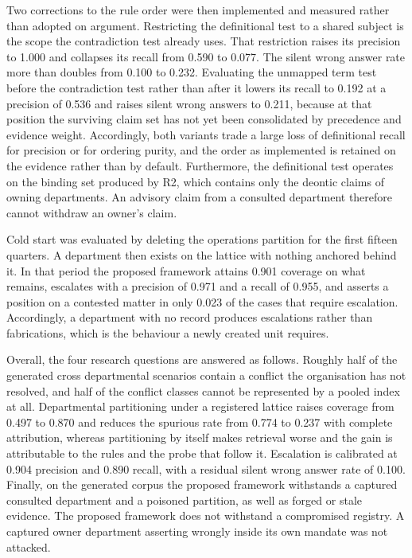 \documentclass[journal]{IEEEtran}
\begin{document}
Two corrections to the rule order were then implemented and measured rather than adopted on argument. Restricting the definitional test to a shared subject is the scope the contradiction test already uses. That restriction raises its precision to 1.000 and collapses its recall from 0.590 to 0.077. The silent wrong answer rate more than doubles from 0.100 to 0.232. Evaluating the unmapped term test before the contradiction test rather than after it lowers its recall to 0.192 at a precision of 0.536 and raises silent wrong answers to 0.211, because at that position the surviving claim set has not yet been consolidated by precedence and evidence weight. Accordingly, both variants trade a large loss of definitional recall for precision or for ordering purity, and the order as implemented is retained on the evidence rather than by default. Furthermore, the definitional test operates on the binding set produced by R2, which contains only the deontic claims of owning departments. An advisory claim from a consulted department therefore cannot withdraw an owner's claim.

Cold start was evaluated by deleting the operations partition for the first fifteen quarters. A department then exists on the lattice with nothing anchored behind it. In that period the proposed framework attains 0.901 coverage on what remains, escalates with a precision of 0.971 and a recall of 0.955, and asserts a position on a contested matter in only 0.023 of the cases that require escalation. Accordingly, a department with no record produces escalations rather than fabrications, which is the behaviour a newly created unit requires.

Overall, the four research questions are answered as follows. Roughly half of the generated cross departmental scenarios contain a conflict the organisation has not resolved, and half of the conflict classes cannot be represented by a pooled index at all. Departmental partitioning under a registered lattice raises coverage from 0.497 to 0.870 and reduces the spurious rate from 0.774 to 0.237 with complete attribution, whereas partitioning by itself makes retrieval worse and the gain is attributable to the rules and the probe that follow it. Escalation is calibrated at 0.904 precision and 0.890 recall, with a residual silent wrong answer rate of 0.100. Finally, on the generated corpus the proposed framework withstands a captured consulted department and a poisoned partition, as well as forged or stale evidence. The proposed framework does not withstand a compromised registry. A captured owner department asserting wrongly inside its own mandate was not attacked.
\end{document}
